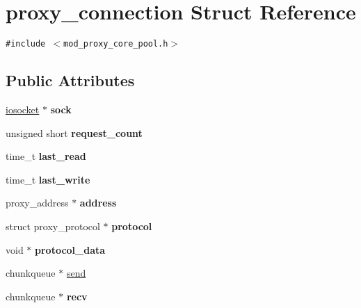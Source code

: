 \hypertarget{structproxy__connection}{
\section{proxy\_\-connection Struct Reference}
\label{structproxy__connection}
}
{\tt \#include $<$mod\_\-proxy\_\-core\_\-pool.h$>$}

\subsection*{Public Attributes}
\begin{CompactItemize}
\item 
\hypertarget{structproxy__connection_76aef07b0324954dbd275c0051803379}{
\hyperlink{structiosocket}{iosocket} $\ast$ \textbf{sock}}
\label{structproxy__connection_76aef07b0324954dbd275c0051803379}

\item 
\hypertarget{structproxy__connection_7dfb4dd4197ed0ceb6e01779526e3361}{
unsigned short \textbf{request\_\-count}}
\label{structproxy__connection_7dfb4dd4197ed0ceb6e01779526e3361}

\item 
\hypertarget{structproxy__connection_76822a8c31421dff99d2f0f130eae548}{
time\_\-t \textbf{last\_\-read}}
\label{structproxy__connection_76822a8c31421dff99d2f0f130eae548}

\item 
\hypertarget{structproxy__connection_681df404af67c10fc3e62df5b1551064}{
time\_\-t \textbf{last\_\-write}}
\label{structproxy__connection_681df404af67c10fc3e62df5b1551064}

\item 
\hypertarget{structproxy__connection_3842e580831d35a4ad97e9e2657c8fbf}{
proxy\_\-address $\ast$ \textbf{address}}
\label{structproxy__connection_3842e580831d35a4ad97e9e2657c8fbf}

\item 
\hypertarget{structproxy__connection_bc257f656ac924d916d6bb8979c2ecfe}{
struct proxy\_\-protocol $\ast$ \textbf{protocol}}
\label{structproxy__connection_bc257f656ac924d916d6bb8979c2ecfe}

\item 
\hypertarget{structproxy__connection_22bb8881e0a4c911fa76d86895843261}{
void $\ast$ \textbf{protocol\_\-data}}
\label{structproxy__connection_22bb8881e0a4c911fa76d86895843261}

\item 
chunkqueue $\ast$ \hyperlink{structproxy__connection_f950123a510466cda48da6724fd12be5}{send}
\item 
\hypertarget{structproxy__connection_52db49892dd5e1cac740d8a9fc893de8}{
chunkqueue $\ast$ \textbf{recv}}
\label{structproxy__connection_52db49892dd5e1cac740d8a9fc893de8}


\end{CompactItemize}
